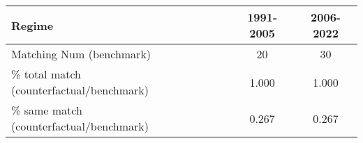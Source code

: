 
\begin{tabular}[t]{lccc}
\toprule
Regime &  & 1991-2005 & 2006-2022\\
\midrule
Matching Num (benchmark) &  & 20 & 30\\
\% total match (counterfactual/benchmark) &  & 1.000 & 1.000\\
\% same match (counterfactual/benchmark) &  & 0.267 & 0.267\\
\bottomrule
\end{tabular}
